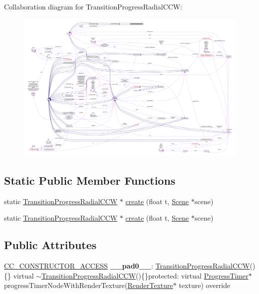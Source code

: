 Collaboration diagram for Transition\+Progress\+Radial\+C\+CW\+:
\nopagebreak
\begin{figure}[H]
\begin{center}
\leavevmode
\includegraphics[width=350pt]{classTransitionProgressRadialCCW__coll__graph}
\end{center}
\end{figure}
\subsection*{Static Public Member Functions}
\begin{DoxyCompactItemize}
\item 
static \hyperlink{classTransitionProgressRadialCCW}{Transition\+Progress\+Radial\+C\+CW} $\ast$ \hyperlink{classTransitionProgressRadialCCW_a4dea77084efcbe290216b873ea93299a}{create} (float t, \hyperlink{classScene}{Scene} $\ast$scene)
\item 
static \hyperlink{classTransitionProgressRadialCCW}{Transition\+Progress\+Radial\+C\+CW} $\ast$ \hyperlink{classTransitionProgressRadialCCW_affe08c019a3332d4e47753fea7492f25}{create} (float t, \hyperlink{classScene}{Scene} $\ast$scene)
\end{DoxyCompactItemize}
\subsection*{Public Attributes}
\begin{DoxyCompactItemize}
\item 
\mbox{\label{classTransitionProgressRadialCCW_a2caf7919e27984c9e315fb443c265691}} 
\hyperlink{_2cocos2d_2cocos_2base_2ccConfig_8h_a25ef1314f97c35a2ed3d029b0ead6da0}{C\+C\+\_\+\+C\+O\+N\+S\+T\+R\+U\+C\+T\+O\+R\+\_\+\+A\+C\+C\+E\+SS} {\bfseries \+\_\+\+\_\+pad0\+\_\+\+\_\+}\+: \hyperlink{classTransitionProgressRadialCCW}{Transition\+Progress\+Radial\+C\+CW}()\{\} virtual $\sim$\hyperlink{classTransitionProgressRadialCCW}{Transition\+Progress\+Radial\+C\+CW}()\{\}protected\+: virtual \hyperlink{classProgressTimer}{Progress\+Timer}$\ast$ progress\+Timer\+Node\+With\+Render\+Texture(\hyperlink{classRenderTexture}{Render\+Texture}$\ast$ texture) override
\end{DoxyCompactItemize}

